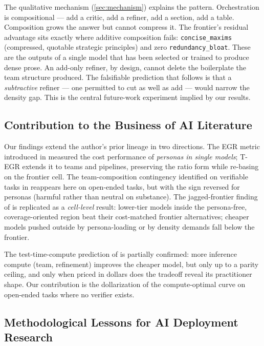 \documentclass[12pt,a4paper]{article}
\begin{document}
The qualitative mechanism (\cref{sec:mechanism}) explains the pattern.
Orchestration is compositional --- add a critic, add a refiner, add a section,
add a table. Composition grows the answer but cannot compress it. The frontier's
residual advantage sits exactly where additive composition fails:
\texttt{concise\_maxims} (compressed, quotable strategic principles) and zero
\texttt{redundancy\_bloat}. These are the outputs of a single model that has
been selected or trained to produce dense prose. An add-only refiner, by design,
cannot delete the boilerplate the team structure produced. The falsifiable
prediction that follows is that a \emph{subtractive} refiner --- one permitted
to cut as well as add --- would narrow the density gap. This is the central
future-work experiment implied by our results.

\subsection{Contribution to the Business of AI Literature}

Our findings extend the author's prior lineage in two directions. The EGR metric
introduced in \citet{Hariri2026b} measured the cost performance of \emph{personas
in single models}; T-EGR extends it to teams and pipelines, preserving the ratio
form while re-basing on the frontier cell. The team-composition contingency
identified on verifiable tasks in \citet{Hariri2025b} reappears here on open-ended
tasks, but with the sign reversed for personas (harmful rather than neutral on
substance). The jagged-frontier finding of \citet{DellAcquaEtAl2023} is replicated
as a \emph{cell-level} result: lower-tier models inside the persona-free,
coverage-oriented region beat their cost-matched frontier alternatives; cheaper
models pushed outside by persona-loading or by density demands fall below the
frontier.

The test-time-compute prediction of \citet{SnellEtAl2024} is partially confirmed:
more inference compute (team, refinement) improves the cheaper model, but only up
to a parity ceiling, and only when priced in dollars does the tradeoff reveal its
practitioner shape. Our contribution is the dollarization of the compute-optimal
curve on open-ended tasks where no verifier exists.

\subsection{Methodological Lessons for AI Deployment Research}
\end{document}
